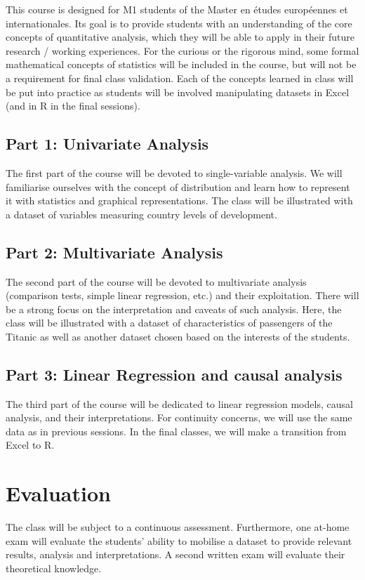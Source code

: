 \documentclass{article}
\begin{document}
	This course is designed for M1 students of the Master en études européennes et internationales. Its goal is to provide students with an understanding of the core concepts of quantitative analysis, which they will be able to apply in their future research / working experiences. For the curious or the rigorous mind, some formal mathematical concepts of statistics will be included in the course, but will not be a requirement for final class validation. Each of the concepts learned in class will be put into practice as students will be involved manipulating datasets in Excel (and in R in the final sessions). 
		
	\subsection*{Part 1: Univariate Analysis}
	
	The first part of the course will be devoted to single-variable analysis. We will familiarise ourselves with the concept of distribution and learn how to represent it with statistics and graphical representations. The class will be illustrated with a dataset of variables measuring country levels of development.
	
	\subsection*{Part 2: Multivariate Analysis}
	
	The second part of the course will be devoted to multivariate analysis (comparison tests, simple linear regression, etc.) and their exploitation. There will be a strong focus on the interpretation and caveats of such analysis. Here, the class will be illustrated with a dataset of characteristics of passengers of the Titanic as well as another dataset chosen based on the interests of the students. 
	
	\subsection*{Part 3: Linear Regression and causal analysis}
	
	The third part of the course will be dedicated to linear regression models, causal analysis, and their interpretations. For continuity concerns, we will use the same data as in previous sessions. In the final classes, we will make a transition from Excel to R.
	
	\section*{Evaluation}
	
	The class will be subject to a continuous assessment. Furthermore, one at-home exam will evaluate the students' ability to mobilise a dataset to provide relevant results, analysis and interpretations. A second written exam will evaluate their theoretical knowledge. 
	
\end{document}
